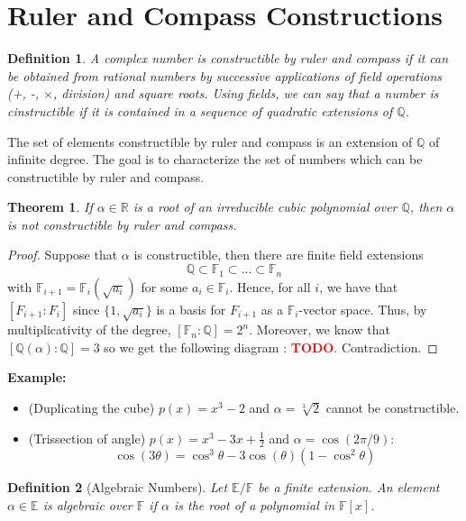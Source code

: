 \documentclass{article}
\newtheorem*{theorem}{Theorem}
\newtheorem*{definition}{Definition}
\newcommand{\R}{\mathbb{R}}
\newcommand{\Q}{\mathbb{Q}}
\newcommand{\F}{\mathbb{F}}
\newcommand{\E}{\mathbb{E}}
\newcommand{\td}{\textcolor{red}{\textbf{TODO}}}
\newenvironment{example}{\noindent\textbf{Example:} \vspace{-0.2cm}\begin{itemize}}{\end{itemize}}
\begin{document}
\section{Ruler and Compass Constructions}

\begin{definition}
    A complex number is constructible by ruler and compass if it can be obtained from rational numbers by successive applications of field operations (+, -, $\times$, division) and square roots. Using fields, we can say that a number is cinstructible if it is contained in a sequence of quadratic extensions of $\Q$.
\end{definition}

The set of elements constructible by ruler and compass is an extension of $\Q$ of infinite degree. The goal is to characterize the set of numbers which can be constructible by ruler and compass.

\begin{theorem}
    If $\alpha \in \R$ is a root of an irreducible cubic polynomial over $\Q$, then $\alpha$ is not constructible by ruler and compass.
\end{theorem}

\begin{proof}
    Suppose that $\alpha$ is constructible, then there are finite field extensions 
    $$\Q \subset \F_1 \subset ... \subset \F_n$$
    with $\F_{i+1} = \F_i(\sqrt{a_i})$ for some $a_i \in \F_i$. Hence, for all $i$, we have that $[F_{i+1} : F_i]$ since $\{1, \sqrt{a_i}\}$ is a basis for $F_{i+1}$ as a $\F_i$-vector space. Thus, by multiplicativity of the degree, $[\F_n : \Q] = 2^n$. Moreover, we know that $[\Q(\alpha) : \Q] = 3$ so we get the following diagram : \td. Contradiction.
\end{proof}

\begin{example}
    \item (Duplicating the cube) $p(x) = x^3 - 2$ and $\alpha = \sqrt[3]{2}$ cannot be constructible.
    \item (Trissection of angle) $p(x) = x^3 - 3x + \frac{1}{2}$ and $\alpha = \cos(2\pi/9)$:
    $$\cos(3\theta) = \cos^3 \theta - 3\cos(\theta)(1 - \cos^2\theta)$$
\end{example}

\begin{definition}[Algebraic Numbers]
    Let $\E / \F$ be a finite extension. An element $\alpha \in \E$ is algebraic over $\F$ if $\alpha$ is the root of a polynomial in $\F[x]$.
\end{definition}
\end{document}
